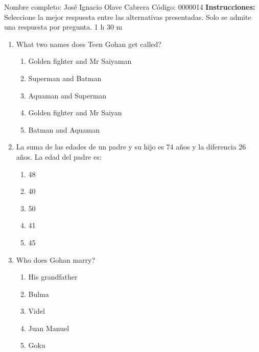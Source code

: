 \documentclass[letterpaper,addpoints,answers,twocolumn,10pt]{exam}
\begin{document}
\noindent Nombre completo: José Ignacio Olave Cabrera
\newline \newline \newline \newline
Código: 0000014\newline \newline 
{\bf Instrucciones:} Seleccione la mejor respuesta entre las alternativas presentadas. Solo se admite una respuesta por pregunta.
 1 h 30 m

\begin{enumerate}[leftmargin=.2in]




\item  What two names does Teen Gohan get called?


\begin{enumerate}[noitemsep,leftmargin=0in]


\item  Golden fighter and Mr Saiyaman
\item  Superman and Batman
\item  Aquaman and Superman
\item  Golden fighter and Mr Saiyan
\item  Batman and Aquaman


\end{enumerate}



\item  La suma de las edades de un padre y su hijo es 74 años y la diferencia 26 años. La edad del padre es:


\begin{enumerate}[noitemsep,leftmargin=0in]


\item  48
\item  40
\item  50
\item  41
\item  45


\end{enumerate}



\item  Who does Gohan marry?


\begin{enumerate}[noitemsep,leftmargin=0in]


\item  His grandfather
\item  Bulma
\item  Videl
\item  Juan Manuel
\item  Goku



\end{enumerate}
\end{enumerate}
\end{document}
